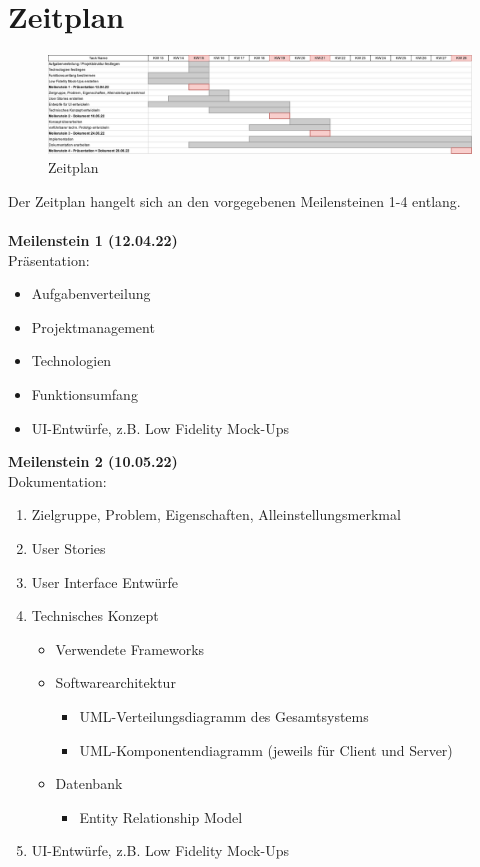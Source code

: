 \chapter{Zeitplan}


\begin{figure}
    \centering
    \includegraphics[width=1\textwidth]{Zeitplan_DeskPlanner.png}
    \caption{Zeitplan}
    \label{fig:Zeitplan}
\end{figure}

Der Zeitplan hangelt sich an den vorgegebenen Meilensteinen 1-4 entlang.
\\
\\
\textbf{Meilenstein 1 (12.04.22)}\\
Präsentation:
\begin{itemize}
    \item Aufgabenverteilung
    \item Projektmanagement
    \item Technologien
    \item Funktionsumfang
    \item UI-Entwürfe, z.B. Low Fidelity Mock-Ups
\end{itemize}

\vspace{0.03\textwidth}
\textbf{Meilenstein 2 (10.05.22)} \\
Dokumentation:
\begin{enumerate}
    \item Zielgruppe, Problem, Eigenschaften, Alleinstellungsmerkmal
    \item User Stories
    \item User Interface Entwürfe
    \item Technisches Konzept
    \begin{itemize}
        \item Verwendete Frameworks
        \item Softwarearchitektur
        \begin{itemize}
            \item UML-Verteilungsdiagramm des Gesamtsystems
            \item UML-Komponentendiagramm (jeweils für Client und Server)
        \end{itemize}
        \item Datenbank
        \begin{itemize}
            \item Entity Relationship Model
        \end{itemize}
    \end{itemize}
    \item UI-Entwürfe, z.B. Low Fidelity Mock-Ups
\end{enumerate}

